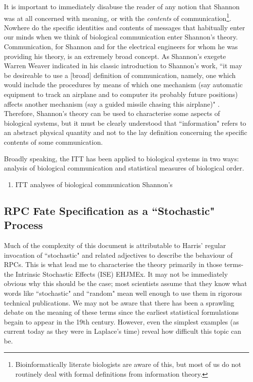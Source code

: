 It is important to immediately disabuse the reader of any notion that Shannon was at all concerned with meaning, or with the \textit{contents} of communication\footnote{Bioinformatically literate biologists are aware of this, but most of us do not routinely deal with formal definitions from information theory.}. Nowhere do the specific identities and contents of messages that habitually enter our minds when we think of biological communication enter Shannon's theory. Communication, for Shannon and for the electrical engineers for whom he was providing his theory, is an extremely broad concept. As Shannon's exegete Warren Weaver indicated in his classic introduction to Shannon's work, ``it may be desireable to use a [broad] definition of communication, namely, one which would include the procedures by means of which one mechanism (say automatic equipment to track an airplane and to computer its probably future positions) affects another mechanism (say a guided missile chasing this airplane)" \cite[p.10]{Shannon1963}. Therefore, Shannon's theory can be used to characterise some aspects of biological systems, but it must be clearly understood that ``information" refers to an abstract physical quantity and not to the lay definition concerning the specific contents of some communication.

Broadly speaking, the ITT has been applied to biological systems in two ways: analysis of biological communication and statistical measures of biological order.

\begin{enumerate}
\item{ITT analyses of biological communication} Shannon's 
\end{enumerate}

\subsection{RPC Fate Specification as a ``Stochastic" Process}
\label{stochastic}

Much of the complexity of this document is attributable to Harris' regular invocation of ``stochastic" and related adjectives to describe the behaviour of RPCs. This is what lead me to characterise the theory primarily in those terms- the Intrinsic Stochastic Effects (ISE) EHJMEx. It may not be immediately obvious why this should be the case; most scientists assume that they know what words like ``stochastic" and ``random" mean well enough to use them in rigorous technical publications. We may not be aware that there has been a sprawling debate on the meaning of these terms since the earliest statistical formulations begain to appear in the 19th century. However, even the simplest examples (as current today as they were in Laplace's time) reveal how difficult this topic can be.

